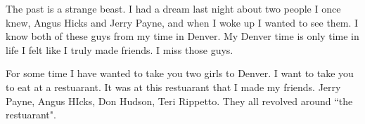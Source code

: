 The past is a strange beast. I had a dream last night about two people I once knew, Angus Hicks and Jerry Payne, and when I woke up I wanted to see them. I know both of these guys from my time in Denver. My Denver time is only time in life I felt like I truly made friends. I miss those guys.

For some time I have wanted to take you two girls to Denver. I want to take you to eat at a restuarant. It was at this restuarant that I made my friends. Jerry Payne, Angus HIcks, Don Hudson, Teri Rippetto. They all revolved around ``the restuarant".